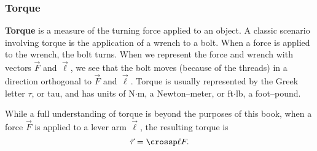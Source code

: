 
\subsubsection*{Torque}

\textbf{Torque} is a measure of the turning force applied to an object. A classic scenario involving torque is the application of a wrench to a bolt. When a force is applied to the wrench, the bolt turns. When we represent the force and wrench with vectors $\vec F$ and $\vec \ell$, we see that the bolt moves (because of the threads) in a  direction orthogonal to $\vec F$ and $\vec \ell$. Torque is usually represented by the Greek letter $\tau$, or tau, and has units of N$\cdot$m, a Newton--meter, or ft$\cdot$lb, a foot--pound.

While a full understanding of torque is beyond the purposes of this book, when a force $\vec F$ is applied to a lever arm $\vec \ell$, the resulting torque is \begin{equation}\vec \tau = \crossp \ell F.\label{eq:crossp3}\end{equation}

